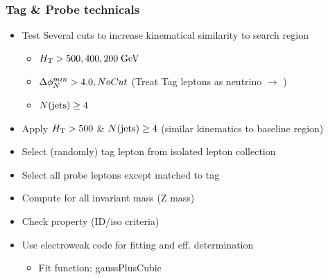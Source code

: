 \documentclass{beamer}
\begin{document}
\begin{frame}
 \frametitle{Tag \& Probe technicals}
 \begin{itemize}
  \item Test Several cuts to increase kinematical similarity to search region
  \begin{itemize}
   \item $H_{\text{T}}>500,400,200 \;\text{Ge}\kern-0.06667em\text{V}$
   \item $\Delta\phi_{N}^{min} >4.0, No Cut$ (Treat Tag leptons \pt as neutrino \pt $\rightarrow$ \MHT)
   \item $N(\text{jets})\geq4$
  \end{itemize}

  \item Apply $H_{\text{T}}>500$ \& $N(\text{jets})\geq4$ (similar kinematics to baseline region)
  \item Select (randomly) tag lepton from isolated lepton collection
  \item Select all probe leptons except matched to tag
  \item Compute for all invariant mass (Z mass)
  \item Check property (ID/iso criteria)
  \item Use electroweak code for fitting and eff. determination
  \begin{itemize}
   \item Fit function: gaussPlusCubic
  \end{itemize}

 \end{itemize}
\end{frame}
\end{document}
